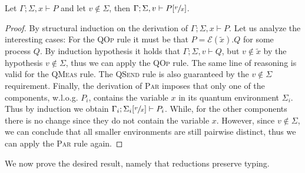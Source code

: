 \begin{theorem}
  Let $\Gamma; \Sigma, x \vdash P$ and let $v \not\in \Sigma$, then $\Gamma; \Sigma, v \vdash P[\sfrac{v}{x}]$.
\end{theorem}
\begin{proof}
  By structural induction on the derivation of $\Gamma; \Sigma, x \vdash P$.
  Let us analyze the interesting cases: For the \textsc{QOp} rule it must be that $P = \mathcal{E}(\widetilde{x}).Q$ for some process $Q$.
  By induction hypothesis it holds that $\Gamma; \Sigma, v \vdash Q$, but $v \not\in \widetilde{x}$ by the hypothesis $v \not\in \Sigma$, thus we can apply the \textsc{QOp} rule.
  The same line of reasoning is valid for the \textsc{QMeas} rule.
  The \textsc{QSend} rule is also guaranteed by the $v \not\in \Sigma$ requirement.
  Finally, the derivation of \textsc{Par} imposes that only one of the components, w.l.o.g. $P_i$, contains the variable $x$ in its quantum environment $\Sigma_i$.
  Thus by induction we obtain $\Gamma_i; \Sigma_i[\sfrac{v}{x}] \vdash P_i$. While, for the other components there is no change since they do not contain the variable $x$.
  However, since $v \not\in \Sigma$, we can conclude that all smaller environments are still pairwise distinct, thus we can apply the \textsc{Par} rule again.
\end{proof}

We now prove the desired result, namely that reductions preserve typing.

